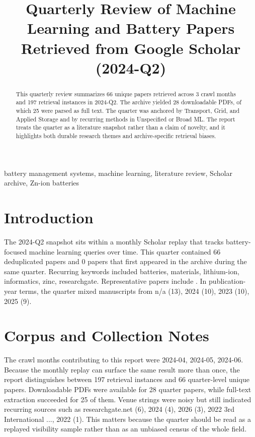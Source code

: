 \documentclass[conference]{IEEEtran}
\begin{document}
\title{ Quarterly Review of Machine Learning and Battery Papers Retrieved from Google Scholar (2024-Q2) }

\author{
}

\maketitle

\begin{abstract}
This quarterly review summarizes 66 unique papers retrieved across 3 crawl months and 197 retrieval instances in 2024-Q2. The archive yielded 28 downloadable PDFs, of which 25 were parsed as full text. The quarter was anchored by Transport, Grid, and Applied Storage and by recurring methods in Unspecified or Broad ML. The report treats the quarter as a literature snapshot rather than a claim of novelty, and it highlights both durable research themes and archive-specific retrieval biases.
\end{abstract}

\begin{IEEEkeywords}
battery management systems, machine learning, literature review, Scholar archive, Zn-ion batteries
\end{IEEEkeywords}

\section{Introduction}
The 2024-Q2 snapshot sits within a monthly Scholar replay that tracks battery-focused machine learning queries over time. This quarter contained 66 deduplicated papers and 0 papers that first appeared in the archive during the same quarter. Recurring keywords included batteries, materials, lithium-ion, informatics, zinc, researchgate. Representative papers include \cite{machinelearningdriven2025,socestimationof2023,textminingfor2022,recentadvancesin2025}. In publication-year terms, the quarter mixed manuscripts from n/a (13), 2024 (10), 2023 (10), 2025 (9).

\section{Corpus and Collection Notes}
The crawl months contributing to this report were 2024-04, 2024-05, 2024-06. Because the monthly replay can surface the same result more than once, the report distinguishes between 197 retrieval instances and 66 quarter-level unique papers. Downloadable PDFs were available for 28 quarter papers, while full-text extraction succeeded for 25 of them. Venue strings were noisy but still indicated recurring sources such as researchgate.net (6), 2024 (4), 2026 (3), 2022 3rd International ..., 2022 (1). This matters because the quarter should be read as a replayed visibility sample rather than as an unbiased census of the whole field.
\end{document}
